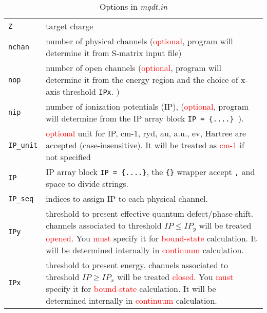 \documentclass[11pt]{article}
\begin{document}
\begin{table}[]
	\caption{Options in \emph{mqdt.in}}
	\label{table:mqdt.in}
	\begin{tabular}{|p{5cm}|p{10.5cm}|}
		\hline
		\verb|Z| & target charge \\
		\verb|nchan|& number of physical channels (\textcolor{red}{optional}, program will determine it from S-matrix input file) \\
		\verb|nop|& number of open channels (\textcolor{red}{optional}, program will determine it from the energy region and the choice of x-axis threshold \verb|IPx|. )\\
		\verb|nip|& number of ionization potentials (IP), (\textcolor{red}{optional}, program will determine from the IP array block \verb|IP = {....} |).\\
		\verb|IP_unit|& \textcolor{red}{optional} unit for IP, cm-1, ryd, au, a.u., ev, Hartree are accepted (case-insensitive). It will be treated as \textcolor{red}{cm-1} if not specified\\
		\verb|IP|& IP array block \verb|IP = {....}|, the \verb|{}| wrapper accept \verb|,| and space to divide strings. \\
		\verb|IP_seq|& indices to assign IP to each physical channel.\\
		
		\verb|IPy|& threshold to present effective quantum defect/phase-shift. channels associated to threshold $IP \leq IP_y$ will be treated \textcolor{red}{opened}. You \textcolor{red}{must} specify it for \textcolor{red}{bound-state} calculation. It will be determined internally in \textcolor{red}{continuum} calculation.\\
		\verb|IPx|& threshold to present energy. channels associated to threshold $IP \geq IP_x$ will be treated \textcolor{red}{closed}. You \textcolor{red}{must} specify it for \textcolor{red}{bound-state} calculation. It will be determined internally in \textcolor{red}{continuum} calculation.\\
		

\end{tabular}
\end{table}
\end{document}
